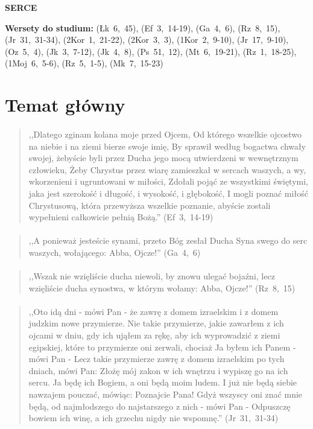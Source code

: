 \documentclass[10pt,a4paper,oneside]{article}
\begin{document}
\centerline{\textbf{\MakeUppercase{Serce}}}
\begin{center}
\textbf{Wersety do studium:} \mbox{(Łk 6, 45)}, \mbox{(Ef 3, 14-19)}, \mbox{(Ga 4, 6)}, \mbox{(Rz 8, 15)}, \mbox{(Jr 31, 31-34)}, \mbox{(2Kor 1, 21-22)}, \mbox{(2Kor 3, 3)}, \mbox{(1Kor 2, 9-10)}, \mbox{(Jr 17, 9-10)}, \mbox{(Oz 5, 4)}, \mbox{(Jk 3, 7-12)}, \mbox{(Jk 4, 8)}, \mbox{(Ps 51, 12)}, \mbox{(Mt 6, 19-21)}, \mbox{(Rz 1, 18-25)}, \mbox{(1Moj 6, 5-6)}, \mbox{(Rz 5, 1-5)}, \mbox{(Mk 7, 15-23)}
\end{center}
\section{Temat główny}
\paragraph{}
\begin{quote}
,,Dlatego zginam kolana moje przed Ojcem, Od którego wszelkie ojcostwo na niebie i na ziemi bierze swoje imię, By sprawił według bogactwa chwały swojej, żebyście byli przez Ducha jego mocą utwierdzeni w wewnętrznym człowieku, Żeby Chrystus przez wiarę zamieszkał w sercach waszych, a wy, wkorzenieni i ugruntowani w miłości, Zdołali pojąć ze wszystkimi świętymi, jaka jest szerokość i długość, i wysokość, i głębokość, I mogli poznać miłość Chrystusową, która przewyższa wszelkie poznanie, abyście zostali wypełnieni całkowicie pełnią Bożą.'' \mbox{(Ef 3, 14-19)}
\end{quote}
\paragraph{}
\begin{quote}
,,A ponieważ jesteście synami, przeto Bóg zesłał Ducha Syna swego do serc waszych, wołającego: Abba, Ojcze!'' \mbox{(Ga 4, 6)}
\end{quote}
\paragraph{}
\begin{quote}
,,Wszak nie wzięliście ducha niewoli, by znowu ulegać bojaźni, lecz wzięliście ducha synostwa, w którym wołamy: Abba, Ojcze!'' \mbox{(Rz 8, 15)}
\end{quote}
\paragraph{}
\begin{quote}
,,Oto idą dni - mówi Pan - że zawrę z domem izraelskim i z domem judzkim nowe przymierze. Nie takie przymierze, jakie zawarłem z ich ojcami w dniu, gdy ich ująłem za rękę, aby ich wyprowadzić z ziemi egipskiej, które to przymierze oni zerwali, chociaż Ja byłem ich Panem - mówi Pan - Lecz takie przymierze zawrę z domem izraelskim po tych dniach, mówi Pan: Złożę mój zakon w ich wnętrzu i wypiszę go na ich sercu. Ja będę ich Bogiem, a oni będą moim ludem. I już nie będą siebie nawzajem pouczać, mówiąc: Poznajcie Pana! Gdyż wszyscy oni znać mnie będą, od najmłodszego do najstarszego z nich - mówi Pan - Odpuszczę bowiem ich winę, a ich grzechu nigdy nie wspomnę.'' \mbox{(Jr 31, 31-34)}
\end{quote}
\end{document}
